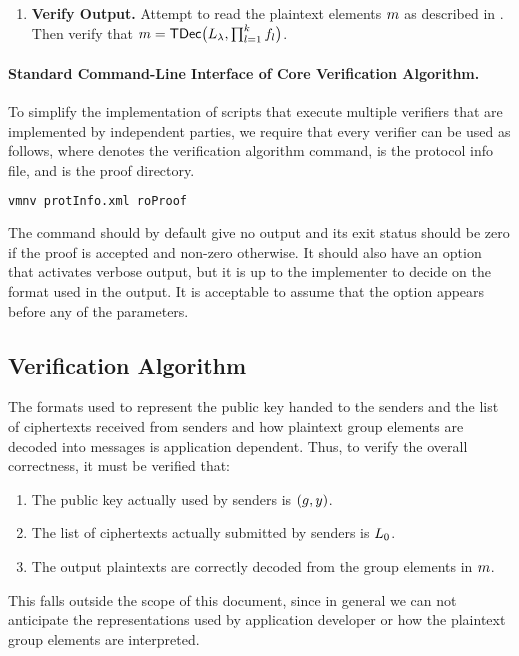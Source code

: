\documentclass[11pt]{article}
\begin{document}
\begin{enumerate}
\begin{enumerate}
  \end{enumerate}

\item\textbf{Verify Output.} Attempt to read the plaintext elements
  $m$ as described in . Then verify that
  $m=\textsf{TDec}\big(L_{\lambda},\prod_{l=1}^{k}f_{l}\big)$.

\end{enumerate}


\paragraph{Standard Command-Line Interface of Core Verification Algorithm.}

To simplify the implementation of scripts that execute multiple
verifiers that are implemented by independent parties, we require that
every verifier can be used as follows, where  denotes the
verification algorithm command,  is the protocol
info file, and  is the proof directory.

\vspace{0.3cm}
\begin{lstlisting}[frame=single,language=xml,
basicstyle=\tt,showstringspaces=false]
vmnv protInfo.xml roProof
\end{lstlisting}

\vspace{0.2cm}
\noindent
The command should by default give no output and its exit status
should be zero if the proof is accepted and non-zero otherwise. It
should also have an option  that activates verbose output,
but it is up to the implementer to decide on the format used in the
output. It is acceptable to assume that the option appears before any
of the parameters.

\subsection{Verification Algorithm}\label{sect:fullverify}

The formats used to represent the public key handed to the senders and
the list of ciphertexts received from senders and how plaintext group
elements are decoded into messages is application dependent. Thus, to
verify the overall correctness, it must be verified that:
\begin{enumerate}

\item The public key actually used by senders is $(g,y)$.

\item The list of ciphertexts actually submitted by senders is
  $L_{0}$.

\item The output plaintexts are correctly decoded from the group
  elements in $m$.

\end{enumerate}
This falls outside the scope of this document, since in general we can
not anticipate the representations used by application developer or
how the plaintext group elements are interpreted.
\end{document}
